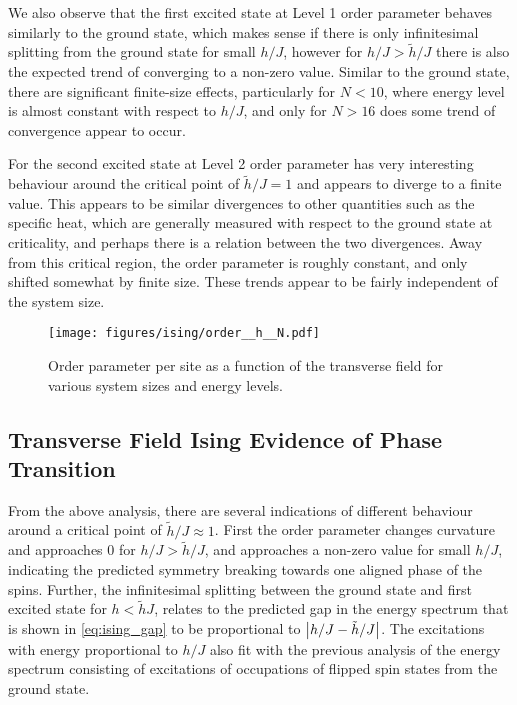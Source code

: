 \documentclass[12pt]{article}{}
\begin{document}
We also observe that the first excited state at Level 1 order parameter behaves similarly to the ground state, which makes sense if there is only infinitesimal splitting from the ground state for small $h/J$, however for $h/J > \tilde{h}/J$ there is also the expected trend of converging to a non-zero value. Similar to the ground state, there are significant finite-size effects, particularly for $N<10$, where energy level is almost constant with respect to $h/J$, and only for $N>16$ does some trend of convergence appear to occur.

For the second excited state at Level 2 order parameter has very interesting behaviour around the critical point of $\tilde{h}/J = 1$ and appears to diverge to a finite value. This appears to be similar divergences to other quantities such as the specific heat, which are generally measured with respect to the ground state at criticality, and perhaps there is a relation between the two divergences. Away from this critical region, the order parameter is roughly constant, and only shifted somewhat by finite size. These trends appear to be fairly independent of the system size.
\begin{figure}[H]
  \centering
  \texttt{[image: figures/ising/order\_\_h\_\_N.pdf]}
  \caption{Order parameter per site as a function of the transverse field for various system sizes and energy levels.}
  \label{fig:ising_order_h_N}
\end{figure}

\subsection{Transverse Field Ising Evidence of Phase Transition}
From the above analysis, there are several indications of different behaviour around a critical point of $\tilde{h}/J \approx 1$. First the order parameter changes curvature and approaches $0$ for $h/J > \tilde{h}/J$, and approaches a non-zero value for small $h/J$, indicating the predicted symmetry breaking towards one aligned phase of the spins. Further, the infinitesimal splitting between the ground state and first excited state for $h < \tilde{h}{J}$, relates to the predicted gap in the energy spectrum that is shown in \cref{eq:ising_gap} to be proportional to $\abs{h/J - \tilde{h}/J}$. The excitations with energy proportional to $h/J$ also fit with the previous analysis of the energy spectrum consisting of excitations of occupations of flipped spin states from the ground state.
\end{document}
